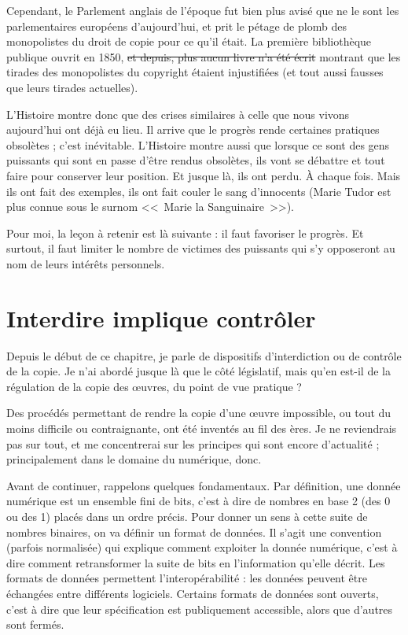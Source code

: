 Cependant, le Parlement anglais de l'époque fut bien plus avisé que ne le sont les parlementaires européens d'aujourd'hui, et prit le pétage de plomb des monopolistes du droit de copie pour ce qu'il était. 
La première bibliothèque publique ouvrit en 1850, \sout{et depuis, plus aucun livre n'a été écrit} montrant que les tirades des monopolistes du copyright étaient injustifiées (et tout aussi fausses que leurs tirades actuelles).

L'Histoire montre donc que des crises similaires à celle que nous vivons aujourd'hui ont déjà eu lieu.
Il arrive que le progrès rende certaines pratiques obsolètes ; c'est inévitable.
L'Histoire montre aussi que lorsque ce sont des gens puissants qui sont en passe d'être rendus obsolètes, ils vont se débattre et tout faire pour conserver leur position.
Et jusque là, ils ont perdu.
À chaque fois.
Mais ils ont fait des exemples, ils ont fait couler le sang d'innocents (Marie Tudor est plus connue sous le surnom <<~Marie la Sanguinaire~>>).

Pour moi, la leçon à retenir est là suivante : il faut favoriser le progrès.
Et surtout, il faut limiter le nombre de victimes des puissants qui s'y opposeront au nom de leurs intérêts personnels.

\section{Interdire implique contrôler} %

Depuis le début de ce chapitre, je parle de dispositifs d'interdiction ou de contrôle de la copie.
Je n'ai abordé jusque là que le côté législatif, mais qu'en est-il de la régulation de la copie des œuvres, du point de vue pratique ?

Des procédés permettant de rendre la copie d'une œuvre impossible, ou tout du moins difficile ou contraignante, ont été inventés au fil des ères.
Je ne reviendrais pas sur tout, et me concentrerai sur les principes qui sont encore d'actualité ; principalement dans le domaine du numérique, donc.

Avant de continuer, rappelons quelques fondamentaux.
Par définition, une donnée numérique est un ensemble fini de bits, c'est à dire de nombres en base 2 (des 0 ou des 1) placés dans un ordre précis.
Pour donner un sens à cette suite de nombres binaires, on va définir un format de données.
Il s'agit une convention (parfois normalisée) qui explique comment exploiter la donnée numérique, c'est à dire comment retransformer la suite de bits en l'information qu'elle décrit.
Les formats de données permettent l'interopérabilité : les données peuvent être échangées entre différents logiciels.
Certains formats de données sont ouverts, c'est à dire que leur spécification est publiquement accessible, alors que d'autres sont fermés.

